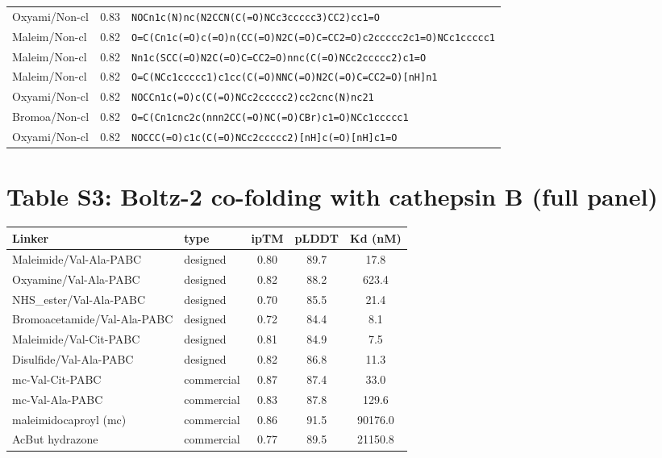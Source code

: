 \documentclass[10pt]{article}
\begin{document}
\begin{longtable}{l c p{10cm}}
Oxyami/Non-cl & 0.83 & \texttt{NOCn1c(N)nc(N2CCN(C(=O)NCc3ccccc3)CC2)cc1=O} \\
Maleim/Non-cl & 0.82 & \texttt{O=C(Cn1c(=O)c(=O)n(CC(=O)N2C(=O)C=CC2=O)c2ccccc2c1=O)NCc1ccccc1} \\
Maleim/Non-cl & 0.82 & \texttt{Nn1c(SCC(=O)N2C(=O)C=CC2=O)nnc(C(=O)NCc2ccccc2)c1=O} \\
Maleim/Non-cl & 0.82 & \texttt{O=C(NCc1ccccc1)c1cc(C(=O)NNC(=O)N2C(=O)C=CC2=O)[nH]n1} \\
Oxyami/Non-cl & 0.82 & \texttt{NOCCn1c(=O)c(C(=O)NCc2ccccc2)cc2cnc(N)nc21} \\
Bromoa/Non-cl & 0.82 & \texttt{O=C(Cn1cnc2c(nnn2CC(=O)NC(=O)CBr)c1=O)NCc1ccccc1} \\
Oxyami/Non-cl & 0.82 & \texttt{NOCCC(=O)c1c(C(=O)NCc2ccccc2)[nH]c(=O)[nH]c1=O} \\
\bottomrule\end{longtable}
\section{Table S3: Boltz-2 co-folding with cathepsin B (full panel)}
\begin{longtable}{l l c c c}\toprule
Linker & type & ipTM & pLDDT & Kd (nM) \\ \midrule\endhead
Maleimide/Val-Ala-PABC & designed & 0.80 & 89.7 & 17.8 \\
Oxyamine/Val-Ala-PABC & designed & 0.82 & 88.2 & 623.4 \\
NHS\_ester/Val-Ala-PABC & designed & 0.70 & 85.5 & 21.4 \\
Bromoacetamide/Val-Ala-PABC & designed & 0.72 & 84.4 & 8.1 \\
Maleimide/Val-Cit-PABC & designed & 0.81 & 84.9 & 7.5 \\
Disulfide/Val-Ala-PABC & designed & 0.82 & 86.8 & 11.3 \\
mc-Val-Cit-PABC & commercial & 0.87 & 87.4 & 33.0 \\
mc-Val-Ala-PABC & commercial & 0.83 & 87.8 & 129.6 \\
maleimidocaproyl (mc) & commercial & 0.86 & 91.5 & 90176.0 \\
AcBut hydrazone & commercial & 0.77 & 89.5 & 21150.8 \\
\bottomrule\end{longtable}
\end{document}
